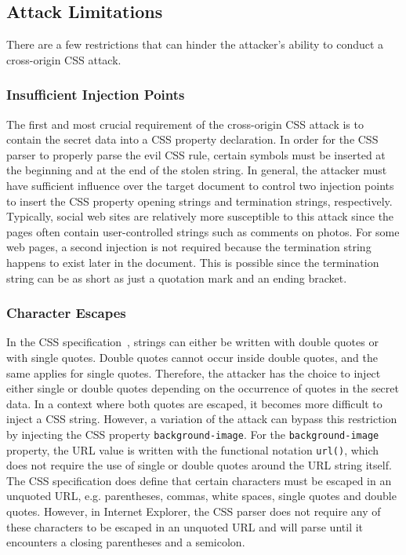 \documentclass{acm_proc_article-sp}
\begin{document}
\subsection{Attack Limitations}
There are a few restrictions that can hinder the attacker's ability to conduct a cross-origin CSS attack.

\subsubsection{Insufficient Injection Points}
The first and most crucial requirement of the cross-origin CSS attack is to contain the secret data into a CSS property declaration. In order for the CSS parser to properly parse the evil CSS rule, certain symbols must be inserted at the beginning and at the end of the stolen string. In general, the attacker must have sufficient influence over the target document to control two injection points to insert the CSS property opening strings and termination strings, respectively. Typically, social web sites are relatively more susceptible to this attack since the pages often contain user-controlled strings such as comments on photos. For some web pages, a second injection is not required because the termination string happens to exist later in the document. This is possible since the termination string can be as short as just a quotation mark and an ending bracket.

\subsubsection{Character Escapes} \label{sec:escapes}
In the CSS specification~\cite{cssspec}, strings can either be written with double quotes or with single quotes. Double quotes cannot occur inside double quotes, and the same applies for single quotes. Therefore, the attacker has the choice to inject either single or double quotes depending on the occurrence of quotes in the secret data. In a context where both quotes are escaped, it becomes more difficult to inject a CSS string. However, a variation of the attack can bypass this restriction by injecting the CSS property \texttt{background-image}. For the \texttt{background-image} property, the URL value is written with the functional notation \texttt{url()}, which does not require the use of single or double quotes around the URL string itself. The CSS specification does define that certain characters must be escaped in an unquoted URL, e.g. parentheses, commas, white spaces, single quotes and double quotes. However, in Internet Explorer, the CSS parser does not require any of these characters to be escaped in an unquoted URL and will parse until it encounters a closing parentheses and a semicolon.
\end{document}
